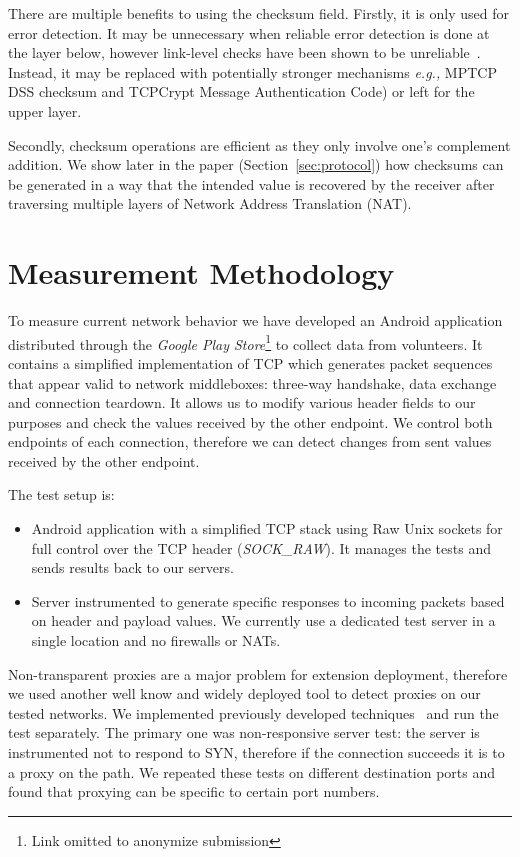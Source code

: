 \documentclass{sig-alternate-10pt}
\providecommand{\eg}{\emph{e.g.,} }
\begin{document}
There are multiple benefits to using the checksum field. Firstly, it is only used for error detection. It may be unnecessary when reliable error detection is done at the layer below, however link-level checks have been shown to be unreliable~\cite{Stone:2000fc}. Instead, it may be replaced with potentially stronger mechanisms \eg MPTCP DSS checksum and TCPCrypt Message Authentication Code) or left for the upper layer.

Secondly, checksum operations are efficient as they only involve one's complement addition. We show later in the paper (Section~\ref{sec:protocol}) how checksums can be generated in a way that the intended value is recovered by the receiver after traversing multiple layers of Network Address Translation (NAT).

\section{Measurement Methodology}

To measure current network behavior we have developed an Android application distributed through the \emph{Google Play Store}\footnote{Link omitted to anonymize submission} to collect data from volunteers. It contains a simplified implementation of TCP which generates packet sequences that appear valid to network middleboxes: three-way handshake, data exchange and connection teardown. It allows us to modify various header fields to our purposes and check the values received by the other endpoint. We control both endpoints of each connection, therefore we can detect changes from sent values received by the other endpoint.

The test setup is:
\begin{itemize}
    \item Android application with a simplified TCP stack using Raw Unix sockets for full control over the TCP header (\emph{SOCK\_RAW}). It manages the tests and sends results back to our servers. 
    \item Server instrumented to generate specific responses to incoming packets based on header and payload values. We currently use a dedicated test server in a single location and no firewalls or NATs.
\end{itemize}

Non-transparent proxies are a major problem for extension deployment, therefore we used another well know and widely deployed tool to detect proxies on our tested networks. We implemented previously developed techniques~\cite{Weaver:RHwbx82O} and run the test separately. The primary one was non-responsive server test: the server is instrumented not to respond to SYN, therefore if the connection succeeds it is to a proxy on the path. We repeated these tests on different destination ports and found that proxying can be specific to certain port numbers.
\end{document}
